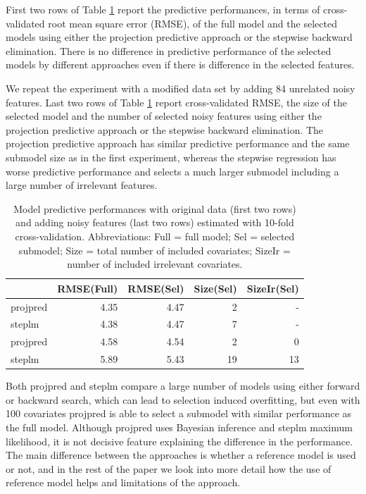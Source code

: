 \documentclass[american,]{article}
\theoremstyle{definition}
\begin{document}
First two rows of Table \ref{tab:model_performances} report the
predictive performances, in terms of cross-validated root mean square
error (RMSE), of the full model and the selected models using either
the projection predictive approach or the stepwise backward
elimination.  There is no difference in predictive performance of the
selected models by different approaches even if there is difference in
the selected features.

We repeat the experiment with a modified data set by adding 84
unrelated noisy features. Last two rows of Table
\ref{tab:model_performances} report cross-validated RMSE, the size of
the selected model and the number of selected noisy features using
either the projection predictive approach or the stepwise backward
elimination.  The projection predictive approach has similar
predictive performance and the same submodel size as in the first
experiment, whereas the stepwise regression has worse predictive
performance and selects a much larger submodel including a large
number of irrelevant features.

\begin{table}[tp]
\scriptsize
\centering
\begin{tabular}{l|r|r|r|r}
  \hline
 & RMSE(Full) & RMSE(Sel) & Size(Sel) & SizeIr(Sel) \\ 
  \hline
projpred & 4.35 & 4.47 & 2 & -  \\
steplm & 4.38 & 4.47 & 7 & - \\
\hline
\hline
projpred & 4.58 & 4.54 & 2 & 0  \\
steplm & 5.89 & 5.43 & 19 & 13 \\
   \hline
\end{tabular}
\caption{Model predictive performances with original data (first two
  rows) and adding noisy features (last two rows) estimated with
  10-fold cross-validation. Abbreviations: Full = full model; Sel =
  selected submodel; Size = total number of included covariates;
  SizeIr = number of included irrelevant covariates.}
\label{tab:model_performances}
\end{table}

Both projpred and steplm compare a large number of models using either
forward or backward search, which can lead to selection induced
overfitting, but even with 100 covariates projpred is able to select a
submodel with similar performance as the full model. Although projpred
uses Bayesian inference and steplm maximum likelihood, it is not
decisive feature explaining the difference in the performance.  The
main difference between the approaches is whether a reference model is
used or not, and in the rest of the paper we look into more detail how
the use of reference model helps and limitations of the approach.
\end{document}
